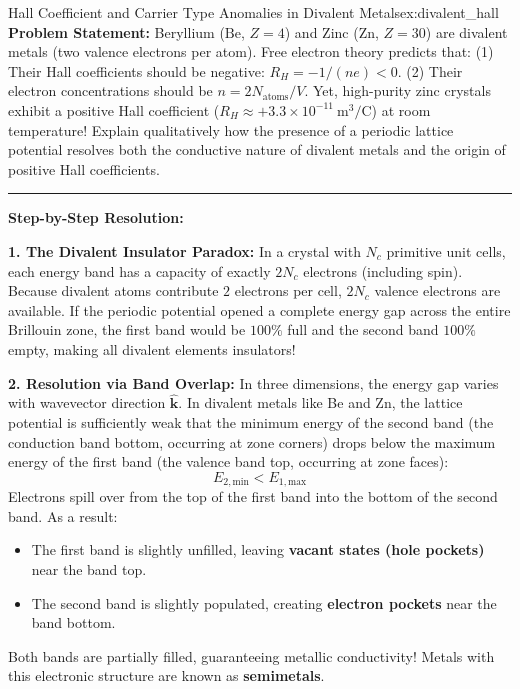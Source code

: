 \documentclass[11pt,a4paper]{article}
\newcommand{\vb}[1]{\mathbf{#1}}
\begin{document}
\begin{examplebox}{Hall Coefficient and Carrier Type Anomalies in Divalent Metals}{ex:divalent_hall}
\textbf{Problem Statement:}
Beryllium ($\mathrm{Be}$, $Z=4$) and Zinc ($\mathrm{Zn}$, $Z=30$) are divalent metals (two valence electrons per atom). Free electron theory predicts that:
(1) Their Hall coefficients should be negative: $R_H = -1/(ne) < 0$.
(2) Their electron concentrations should be $n = 2 N_{\mathrm{atoms}}/V$.
Yet, high-purity zinc crystals exhibit a positive Hall coefficient ($R_H \approx +3.3 \times 10^{-11}\ \mathrm{m^3/C}$) at room temperature! 
Explain qualitatively how the presence of a periodic lattice potential resolves both the conductive nature of divalent metals and the origin of positive Hall coefficients.

\vspace{0.2cm}\hrule\vspace{0.2cm}
\textbf{Step-by-Step Resolution:}

\textbf{1. The Divalent Insulator Paradox:}
In a crystal with $N_c$ primitive unit cells, each energy band has a capacity of exactly $2N_c$ electrons (including spin). Because divalent atoms contribute $2$ electrons per cell, $2N_c$ valence electrons are available. If the periodic potential opened a complete energy gap across the entire Brillouin zone, the first band would be $100\%$ full and the second band $100\%$ empty, making all divalent elements insulators!

\textbf{2. Resolution via Band Overlap:}
In three dimensions, the energy gap varies with wavevector direction $\hat{\vb{k}}$. In divalent metals like Be and Zn, the lattice potential is sufficiently weak that the minimum energy of the second band (the conduction band bottom, occurring at zone corners) drops below the maximum energy of the first band (the valence band top, occurring at zone faces):
\[
E_{2,\mathrm{min}} < E_{1,\mathrm{max}}
\]
Electrons spill over from the top of the first band into the bottom of the second band. As a result:
\begin{itemize}
    \item The first band is slightly unfilled, leaving \textbf{vacant states (hole pockets)} near the band top.
    \item The second band is slightly populated, creating \textbf{electron pockets} near the band bottom.
\end{itemize}
Both bands are partially filled, guaranteeing metallic conductivity! Metals with this electronic structure are known as \textbf{semimetals}.


\end{examplebox}
\end{document}
